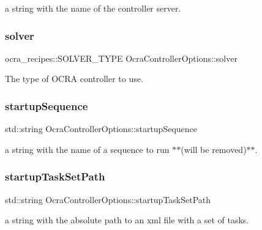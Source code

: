a string with the name of the controller server. \hypertarget{classOcraControllerOptions_af79b8705c3f3097b642262bc877eaa8e}{}\label{classOcraControllerOptions_af79b8705c3f3097b642262bc877eaa8e} 
\subsubsection{\texorpdfstring{solver}{solver}}
{\footnotesize\ttfamily ocra\+\_\+recipes\+::\+S\+O\+L\+V\+E\+R\+\_\+\+T\+Y\+PE Ocra\+Controller\+Options\+::solver}

The type of O\+C\+RA controller to use. \hypertarget{classOcraControllerOptions_ab01efbd786ad8bc5beb6de02dbcd0936}{}\label{classOcraControllerOptions_ab01efbd786ad8bc5beb6de02dbcd0936} 
\subsubsection{\texorpdfstring{startup\+Sequence}{startupSequence}}
{\footnotesize\ttfamily std\+::string Ocra\+Controller\+Options\+::startup\+Sequence}

a string with the name of a sequence to run $\ast$$\ast$(will be removed)$\ast$$\ast$. \hypertarget{classOcraControllerOptions_af91566ecff3f7ed02571369c7af061ce}{}\label{classOcraControllerOptions_af91566ecff3f7ed02571369c7af061ce} 
\subsubsection{\texorpdfstring{startup\+Task\+Set\+Path}{startupTaskSetPath}}
{\footnotesize\ttfamily std\+::string Ocra\+Controller\+Options\+::startup\+Task\+Set\+Path}

a string with the absolute path to an xml file with a set of tasks. \hypertarget{classOcraControllerOptions_ab706ae593bf5b30433cfd6f957b51db4}{}\label{classOcraControllerOptions_ab706ae593bf5b30433cfd6f957b51db4} 
